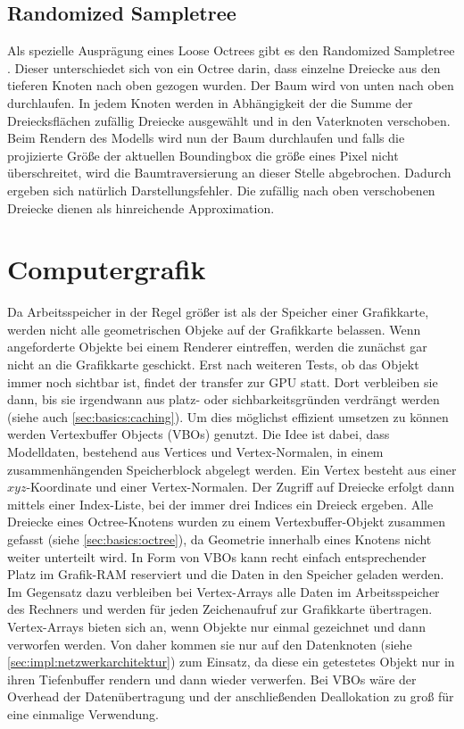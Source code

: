 \subsection{Randomized Sampletree}
\label{sec:basics:sampletree}
Als spezielle Ausprägung eines Loose Octrees gibt es den Randomized Sampletree \cite{klein}. Dieser unterschiedet sich von ein Octree darin, dass einzelne Dreiecke aus den tieferen Knoten nach oben gezogen wurden. Der Baum wird von unten nach oben durchlaufen. In jedem Knoten werden in Abhängigkeit der die Summe der Dreiecksflächen zufällig Dreiecke ausgewählt und in den Vaterknoten verschoben. Beim Rendern des Modells wird nun der Baum durchlaufen und falls die projizierte Größe der aktuellen Boundingbox die größe eines Pixel nicht überschreitet, wird die Baumtraversierung an dieser Stelle abgebrochen. Dadurch ergeben sich natürlich Darstellungsfehler. 
%
Die zufällig nach oben verschobenen Dreiecke dienen als hinreichende Approximation. 


\section{Computergrafik}
\label{sec:basics:computergrafik}
Da Arbeitsspeicher in der Regel größer ist als der Speicher einer Grafikkarte, werden nicht alle geometrischen Objeke auf der Grafikkarte belassen. Wenn angeforderte Objekte bei einem Renderer eintreffen, werden die zunächst gar nicht an die Grafikkarte geschickt. Erst nach weiteren Tests, ob das Objekt immer noch sichtbar ist, findet der transfer zur GPU statt. Dort verbleiben sie dann, bis sie irgendwann aus platz- oder sichbarkeitsgründen verdrängt werden (siehe auch \ref{sec:basics:caching}). Um dies möglichst effizient umsetzen zu können werden Vertexbuffer Objects  (VBOs) genutzt. Die Idee ist dabei, dass Modelldaten, bestehend aus Vertices und Vertex-Normalen, in einem zusammenhängenden Speicherblock abgelegt werden. Ein Vertex besteht aus einer $xyz$-Koordinate und einer Vertex-Normalen. Der Zugriff auf Dreiecke erfolgt dann mittels einer Index-Liste, bei der immer drei Indices ein Dreieck ergeben. Alle Dreiecke eines Octree-Knotens wurden zu einem Vertexbuffer-Objekt zusammen gefasst (siehe \ref{sec:basics:octree}), da Geometrie innerhalb eines Knotens nicht weiter unterteilt wird. In Form von VBOs kann recht einfach entsprechender Platz im Grafik-RAM reserviert und die Daten in den Speicher geladen werden.\\
Im Gegensatz dazu verbleiben bei Vertex-Arrays alle Daten im Arbeitsspeicher des Rechners und werden für jeden Zeichenaufruf zur Grafikkarte übertragen. Vertex-Arrays bieten sich an, wenn Objekte nur einmal gezeichnet und dann verworfen werden. Von daher kommen sie nur auf den Datenknoten (siehe \ref{sec:impl:netzwerkarchitektur}) zum Einsatz, da diese ein getestetes Objekt nur in ihren Tiefenbuffer rendern und dann wieder verwerfen. Bei VBOs wäre der Overhead der Datenübertragung und der anschließenden Deallokation zu groß für eine einmalige Verwendung.

